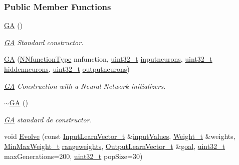 \subsubsection*{Public Member Functions}
\begin{DoxyCompactItemize}
\item 
\hyperlink{class_soil_math_1_1_g_a_a759b77fbe44fa1d5df5bcbdee9d97c4e}{G\+A} ()
\begin{DoxyCompactList}\small\item\em \hyperlink{class_soil_math_1_1_g_a}{G\+A} Standard constructor. \end{DoxyCompactList}\item 
\hyperlink{class_soil_math_1_1_g_a_a6fed498b99290a5218cc3ecd9537fc74}{G\+A} (\hyperlink{_soil_math_types_8h_a7791f1b8f92a964847637c5d657c1b10}{N\+Nfunction\+Type} nnfunction, \hyperlink{_soil_math_types_8h_a435d1572bf3f880d55459d9805097f62}{uint32\+\_\+t} \hyperlink{class_soil_math_1_1_g_a_ac32591e30dde5ac854ae57a7b9e33298}{inputneurons}, \hyperlink{_soil_math_types_8h_a435d1572bf3f880d55459d9805097f62}{uint32\+\_\+t} \hyperlink{class_soil_math_1_1_g_a_a3f1eee7492f68a05b9b06ee8afb2ec20}{hiddenneurons}, \hyperlink{_soil_math_types_8h_a435d1572bf3f880d55459d9805097f62}{uint32\+\_\+t} \hyperlink{class_soil_math_1_1_g_a_ab454f9968d5ce2a294b89f85c9d3a74f}{outputneurons})
\begin{DoxyCompactList}\small\item\em \hyperlink{class_soil_math_1_1_g_a}{G\+A} Construction with a Neural Network initializers. \end{DoxyCompactList}\item 
\hyperlink{class_soil_math_1_1_g_a_a7a7087b2c5a268a1a9bccc04600537f6}{$\sim$\+G\+A} ()
\begin{DoxyCompactList}\small\item\em \hyperlink{class_soil_math_1_1_g_a}{G\+A} standard de constructor. \end{DoxyCompactList}\item 
void \hyperlink{class_soil_math_1_1_g_a_aca448f36c1f98b4906d0754cf354cccf}{Evolve} (const \hyperlink{_soil_math_types_8h_a45aa81992bf0ddf272907bd4fa0b96cf}{Input\+Learn\+Vector\+\_\+t} \&\hyperlink{class_soil_math_1_1_g_a_a99276ad62b9616d0f18becc4fbb22980}{input\+Values}, \hyperlink{_soil_math_types_8h_ac56ad2b88186620fd0de0d213aa715dd}{Weight\+\_\+t} \&weights, \hyperlink{_soil_math_types_8h_aaa919636507bcd52b19efa301aa80b9a}{Min\+Max\+Weight\+\_\+t} \hyperlink{class_soil_math_1_1_g_a_a7613e87f93e42724d03008e3603cf21b}{rangeweights}, \hyperlink{_soil_math_types_8h_a2d8b5a261688166d724b68addd8561e6}{Output\+Learn\+Vector\+\_\+t} \&\hyperlink{class_soil_math_1_1_g_a_a4366c8f0852e8ec2bf37b3d5324b57cb}{goal}, \hyperlink{_soil_math_types_8h_a435d1572bf3f880d55459d9805097f62}{uint32\+\_\+t} max\+Generations=200, \hyperlink{_soil_math_types_8h_a435d1572bf3f880d55459d9805097f62}{uint32\+\_\+t} pop\+Size=30)

\end{DoxyCompactItemize}
